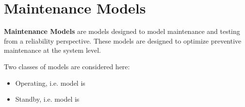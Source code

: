 \section{Maintenance Models}
\label{sec:MaintenanceModels}

\textbf{Maintenance Models} are models designed to model maintenance and testing from a reliability perspective.
These models are designed to optimize preventive maintenance at the system level.

Two classes of models are considered here:
\begin{itemize}
	\item Operating, i.e. model  is 
	\item Standby, i.e. model  is 
\end{itemize}

